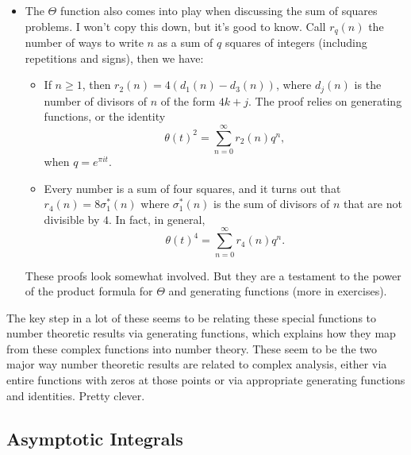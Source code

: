 \documentclass[11pt,
        usenames, %
        dvipsnames %
    ]{report}
\newcommand*{\p}[1]{\left(#1\right)}
\begin{document}
\begin{itemize}
    \item The $\Theta$ function also comes into play when discussing the sum of
        squares problems. I won't copy this down, but it's good to know. Call
        $r_q(n)$ the number of ways to write $n$ as a sum of $q$ squares of
        integers (including repetitions and signs), then we have:
        \begin{itemize}
            \item If $n \geq 1$, then $r_2(n) = 4\p{d_1(n) - d_3(n)}$, where
                $d_j(n)$ is the number of divisors of $n$ of the form $4k + j$.
                The proof relies on generating functions, or the identity
                \begin{equation}
                    \theta(t)^2 = \sum\limits_{n = 0}^\infty r_2(n) q^n,
                \end{equation}
                when $q = e^{\pi i t}$.

            \item Every number is a sum of four squares, and it turns out that
                $r_4(n) = 8\sigma_1^*(n)$ where $\sigma_1^*(n)$ is the sum of
                divisors of $n$ that are not divisible by $4$. In fact, in
                general,
                \begin{equation}
                    \theta(t)^4 = \sum\limits_{n = 0}^\infty r_4(n)q^n.
                \end{equation}
        \end{itemize}
        These proofs look somewhat involved. But they are a testament to the
        power of the product formula for $\Theta$ and generating functions (more
        in exercises).
\end{itemize}
The key step in a lot of these seems to be relating these special functions to
number theoretic results via generating functions, which explains how they map
from these complex functions into number theory. These seem to be the two major
way number theoretic results are related to complex analysis, either via entire
functions with zeros at those points or via appropriate generating functions and
identities. Pretty clever.

\subsection{Asymptotic Integrals}
\end{document}
